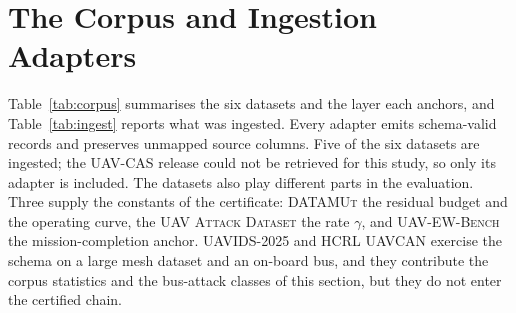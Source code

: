 \documentclass[conference,letterpaper,10pt]{IEEEtran}   %
\newcommand{\dataset}[1]{\textsc{#1}}
\begin{document}
\section{The Corpus and Ingestion Adapters}
\label{sec:corpus}
Table~\ref{tab:corpus} summarises the six datasets and the layer each anchors,
and Table~\ref{tab:ingest} reports what was ingested. Every adapter emits
schema-valid records and preserves unmapped source columns. Five of the six
datasets are ingested; the \dataset{UAV-CAS} release could not be retrieved for
this study, so only its adapter is included. The datasets also play different
parts in the evaluation. Three supply the constants of the certificate:
\dataset{DATAMUt} the residual budget and the operating curve, the \dataset{UAV
Attack Dataset} the rate $\gamma$, and \dataset{UAV-EW-Bench} the
mission-completion anchor. \dataset{UAVIDS-2025} and \dataset{HCRL UAVCAN}
exercise the schema on a large mesh dataset and an on-board bus, and they
contribute the corpus statistics and the bus-attack classes of this section, but
they do not enter the certified chain.
\end{document}
